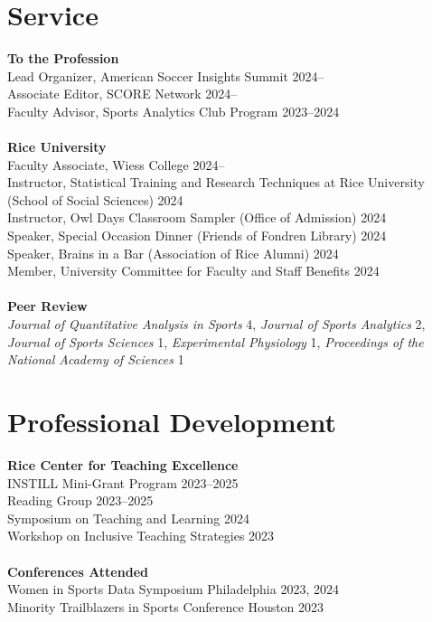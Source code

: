 \documentclass{article}
\begin{document}
\section*{\sc Service}

{\bf To the Profession}\\
Lead Organizer, American Soccer Insights Summit \hfill 2024--\\
Associate Editor, SCORE Network \hfill 2024--\\
Faculty Advisor, Sports Analytics Club Program \hfill 2023--2024\\
~\\
{\bf Rice University}\\
Faculty Associate, Wiess College \hfill 2024--\\
Instructor, Statistical Training and Research Techniques at Rice University \hfill (School of Social Sciences) \hfill 2024\\
Instructor, Owl Days Classroom Sampler (Office of Admission) \hfill 2024\\
Speaker, Special Occasion Dinner (Friends of Fondren Library) \hfill 2024\\
Speaker, Brains in a Bar (Association of Rice Alumni) \hfill 2024\\
Member, University Committee for Faculty and Staff Benefits \hfill 2024\\
~\\
{\bf Peer Review}\\
{\it Journal of Quantitative Analysis in Sports} 4, {\it Journal of Sports Analytics} 2, {\it Journal of Sports Sciences} 1, {\it Experimental Physiology} 1, {\it Proceedings of the National Academy of Sciences} 1

\section*{\sc Professional Development}

{\bf Rice Center for Teaching Excellence}\\
INSTILL Mini-Grant Program \hfill 2023--2025\\
Reading Group \hfill 2023--2025\\
Symposium on Teaching and Learning \hfill 2024\\
Workshop on Inclusive Teaching Strategies \hfill 2023\\
~\\
{\bf Conferences Attended}\\
Women in Sports Data Symposium \hfill Philadelphia 2023, 2024\\
Minority Trailblazers in Sports Conference \hfill Houston 2023
\end{document}
